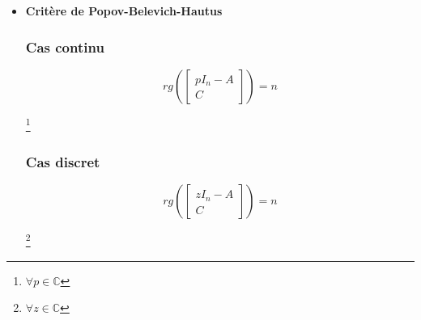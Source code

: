 {{{{{{\begin{itemize}
        \subsubsection{Cas continu}
        Soit
        \[ Q_{c} = 
        \begin{bmatrix}
            C \\
            CA \\
            ... \\
            CA^{n-1}
        \end{bmatrix}
        \in M_{n}(\mathbb{C})
        \]
        \begin{center}
             \footnote{$n$ lignes indépendantes. La matrice $Q_{0}$ est formée par les vecteurs ligne $(CA^{i})_{i \in \{1,n-1 \}}$ avec $A$ matrice carrée de taille $n$ et $C$ vecteur ligne de taille $n$}
        \end{center}
        \subsubsection{Cas discret}
        \[
        Q_{0} =
        \begin{bmatrix}
            C \\
            CF \\
            ... \\
            CF^{n-1}
        \end{bmatrix} 
        \in M_{n}(\mathbb{C})
        \]
        \begin{center}
        \end{center}
        \newpage
    \item \textbf{Critère de Popov-Belevich-Hautus}
        \subsubsection{Cas continu}
        \begin{center}
            \[
            rg(
                \begin{bmatrix}
                    pI_{n} - A \\
                    C
                \end{bmatrix}
            ) = n
            \] 
        \end{center}
        \footnote{$\forall p \in \mathbb{C}$}
        \subsubsection{Cas discret}
        \begin{center}
            \[
            rg(
                \begin{bmatrix}
                    zI_{n} - A \\
                    C
                \end{bmatrix}
            ) = n
            \]
        \end{center}
        \footnote{$\forall z \in \mathbb{C}$}
\end{itemize}
\newpage
}}}}}}
